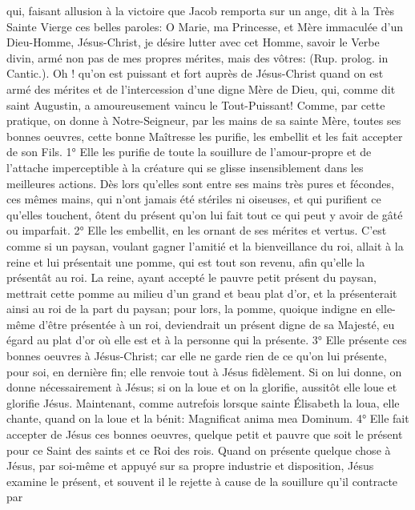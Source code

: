 qui, faisant allusion à la victoire que Jacob remporta sur un ange, dit à la Très Sainte Vierge ces belles paroles: O
Marie, ma Princesse, et Mère immaculée d'un Dieu-Homme, Jésus-Christ, je désire lutter avec cet Homme, savoir
le Verbe divin, armé non pas de mes propres mérites, mais des vôtres: 
(Rup. prolog. in Cantic.).
Oh ! qu'on est puissant et fort auprès de Jésus-Christ quand on est armé des mérites et de l'intercession d'une
digne Mère de Dieu, qui, comme dit saint Augustin, a amoureusement vaincu le Tout-Puissant!
 Comme, par cette pratique, on donne à Notre-Seigneur, par les mains de sa sainte Mère, toutes ses bonnes
oeuvres, cette bonne Maîtresse les purifie, les embellit et les fait accepter de son Fils.
1° Elle les purifie de toute la souillure de l'amour-propre et de l'attache imperceptible à la créature qui se glisse
insensiblement dans les meilleures actions. Dès lors qu'elles sont entre ses mains très pures et fécondes, ces
mêmes mains, qui n'ont jamais été stériles ni oiseuses, et qui purifient ce qu'elles touchent, ôtent du présent qu'on
lui fait tout ce qui peut y avoir de gâté ou imparfait.
 2° Elle les embellit, en les ornant de ses mérites et vertus. C'est comme si un paysan, voulant gagner l'amitié
et la bienveillance du roi, allait à la reine et lui présentait une pomme, qui est tout son revenu, afin qu'elle la
présentât au roi. La reine, ayant accepté le pauvre petit présent du paysan, mettrait cette pomme au milieu d'un
grand et beau plat d'or, et la présenterait ainsi au roi de la part du paysan; pour lors, la pomme, quoique indigne en
elle-même d'être présentée à un roi, deviendrait un présent digne de sa Majesté, eu égard au plat d'or où elle est
et à la personne qui la présente.
 3° Elle présente ces bonnes oeuvres à Jésus-Christ; car elle ne garde rien de ce qu'on lui présente, pour soi,
en dernière fin; elle renvoie tout à Jésus fidèlement. Si on lui donne, on donne nécessairement à Jésus; si on la
loue et on la glorifie, aussitôt elle loue et glorifie Jésus. Maintenant, comme autrefois lorsque sainte Élisabeth la
loua, elle chante, quand on la loue et la bénit: Magnificat anima mea Dominum.
 4° Elle fait accepter de Jésus ces bonnes oeuvres, quelque petit et pauvre que soit le présent pour ce Saint
des saints et ce Roi des rois. Quand on présente quelque chose à Jésus, par soi-même et appuyé sur sa propre
industrie et disposition, Jésus examine le présent, et souvent il le rejette à cause de la souillure qu'il contracte par
